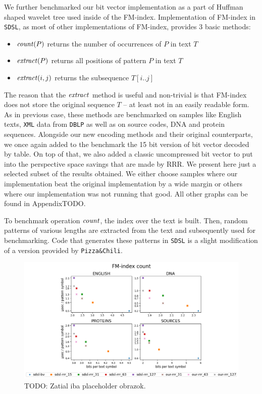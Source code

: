We further benchmarked our bit vector implementation as a part of Huffman shaped wavelet tree
used inside of the FM-index. Implementation of FM-index in \texttt{SDSL}, as most of other
implementations of FM-index, provides 3 basic methods:

\begin{itemize}
	\item $\mathit{count}(P)$ returns the number of occurrences of $P$ in text $T$
	\item $\mathit{extract}(P)$ returns all positions of pattern $P$ in text $T$
	\item $\mathit{extract}(i, j)$ returns the subsequence $T[i..j]$
\end{itemize}

The reason that the $\mathit{extract}$ method is useful and non-trivial is that FM-index
does not store the original sequence $T$ -- at least not in an easily readable form.
As in previous case, these methods are benchmarked on samples like English texts, \texttt{XML}
data from \texttt{DBLP} as well as on source codes, DNA and protein sequences.
Alongside our new encoding methods and their original counterparts, we once again added
to the benchmark the 15 bit version of bit vector decoded by table. On top of that, we
also added a classic uncompressed bit vector to put into the perspective space savings that
are made by RRR. We present here just a selected subset of the results obtained. We either
choose samples where our implementation beat the original implementation by a wide margin
or others where our implementation was not running that good. All other graphs can be found
in AppendixTODO.

To benchmark operation $\mathit{count}$, the index over the text is built. Then, random patterns of
various lengths are extracted from the text and subsequently used for benchmarking. Code
that generates these patterns in \texttt{SDSL} is a slight modification of a version provided
by \texttt{Pizza\&Chili}.

\begin{figure}
	\centerline{
		\includegraphics[width=\textwidth, height=0.7\textheight]{images/vysledky_sdsl_count}
	}
	\caption[TODO]{TODO: Zatial iba placeholder obrazok.
	}
	\label{obr:benchmark_sdsl_count}
\end{figure}

